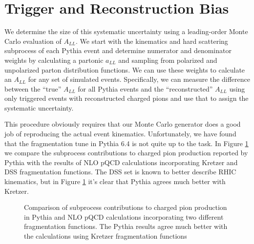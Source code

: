 \section{Trigger and Reconstruction Bias}

We determine the size of this systematic uncertainty using a leading-order
Monte Carlo evaluation of $A_{LL}$. We start with the kinematics and hard
scattering subprocess of each Pythia event and determine numerator and
denominator weights by calculating a partonic $a_{LL}$ and sampling from
polarized and unpolarized parton distribution functions. We can use these
weights to calculate an $A_{LL}$ for any set of simulated events.
Specifically, we can measure the difference between the ``true'' $A_{LL}$ for
all Pythia events and the ``reconstructed'' $A_{LL}$ using only triggered
events with reconstructed charged pions and use that to assign the systematic
uncertainty.

This procedure obviously requires that our Monte Carlo generator does a good
job of reproducing the actual event kinematics. Unfortunately, we have found
that the fragmentation tune in Pythia 6.4 is not quite up to the task. In
Figure \ref{fig:subprocess-fractions} we compare the subprocess contributions
to charged pion production reported by Pythia with the results of NLO pQCD
calculations incorporating Kretzer and DSS fragmentation functions. The DSS
set is known to better describe RHIC kinematics, but in Figure
\ref{fig:subprocess-fractions} it's clear that Pythia agrees much better with
Kretzer.

\begin{figure}
  \caption{Comparison of subprocess contributions to charged pion production
  in Pythia and NLO pQCD calculations incorporating two different
  fragmentation functions. The Pythia results agree much better with the
  calculations using Kretzer fragmentation functions}
  \label{fig:subprocess-fractions}
\end{figure}

